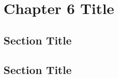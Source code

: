 \documentclass[../main.tex]{subfiles}
\begin{document}
\newpage
\doublespacing
\setcounter{chapter}{5}
\thesischapterstyle
\thispagestyle{empty}

\chapter{Chapter 6 Title}\label{chap6:short-label}

\section{Section Title}
\lipsum[1]

\section{Section Title}
\lipsum[2]
\end{document}
